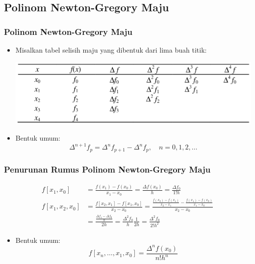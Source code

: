 \documentclass[pdflatex,compress,mathserif]{beamer}
\begin{document}
\subsection{Polinom Newton-Gregory Maju}

\begin{frame}
	\frametitle{Polinom Newton-Gregory Maju}
	\begin{itemize}
		\item Misalkan tabel selisih maju yang dibentuk dari lima buah titik:
		\begin{center}
			\includegraphics[width=\linewidth]{img/img19}
		\end{center}
		\item Bentuk umum:
		\[ \Delta^{n+1}f_p = \Delta^{n}f_{p+1} - \Delta^{n}f_p,\quad n=0,1,2,\dots \]
	\end{itemize}
\end{frame}

\begin{frame}
	\frametitle{Penurunan Rumus Polinom Newton-Gregory Maju}
	\begin{align*}
		f[x_1,x_0] &= \frac{f(x_1) - f(x_0)}{x_1-x_0} = \frac{\Delta f(x_0)}{h} = \frac{\Delta f_0}{1!h} \\
		f[x_1, x_2, x_0] &= \frac{f[x_2,x_1] - f[x_1,x_0]}{x_2-x_0} = \frac{\frac{f(x_2) - f(x_1)}{x_2-x_1} - \frac{f(x_1) - f(x_0)}{x_1-x_0}}{x_2-x_0} \\
		&= \frac{\frac{\Delta f_1 - \Delta f_0}{h}}{2h} = \frac{\Delta^2 f_0}{h}\frac{1}{2h} = \frac{\Delta^2f_0}{2!h^2}
	\end{align*}
	\begin{itemize}
		\item Bentuk umum:
		\[ f[x_n,\dots,x_1,x_0] = \frac{\Delta^n f(x_0)}{n!h^n} \]
	\end{itemize}
\end{frame}
\end{document}

